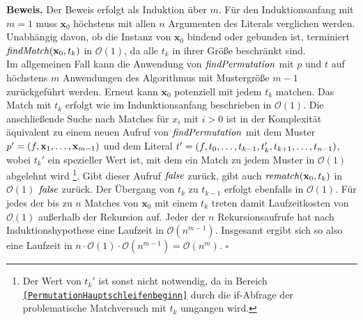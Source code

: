 \textbf{Beweis.}
Der Beweis erfolgt als Induktion über $m$.
Für den Induktionsanfang mit $m = 1$ muss $\mathbf x_0$ höchstens mit allen $n$ Argumenten des Literals verglichen werden. Unabhängig davon, ob die Instanz von $\mathbf x_0$ bindend oder gebunden ist, terminiert $\mathit{findMatch}(\mathbf x_0, t_k)$ in $\mathcal O(1)$, da alle $t_k$ in ihrer Größe beschränkt sind. \\
Im allgemeinen Fall kann die Anwendung von $\mathit{findPermutation}$ mit $p$ und $t$ auf höchstens $m$ Anwendungen des Algorithmus mit Mustergröße $m-1$ zurückgeführt werden. Erneut kann $\mathbf x_0$ potenziell mit jedem $t_k$ matchen. Das Match mit $t_k$ erfolgt wie im Indunktionsanfang beschrieben in $\mathcal O (1)$. Die anschließende Suche nach Matches für $x_i$ mit $i > 0$ ist in der Komplexität äquivalent zu einem neuen Aufruf von $\mathit{findPermutation}$ mit dem Muster $p' = (f, {\mathbf x}_{1}, \dots, {\mathbf x}_{m-1})$ und dem Literal $t' = (f, {t}_{0}, \dots, {t}_{k-1}, t_k', {t}_{k+1}, \dots, {t}_{n-1})$, wobei $t_k'$ ein spezieller Wert ist, mit dem ein Match zu jedem Muster in $\mathcal O (1)$ abgelehnt wird \footnote{Der Wert von $t_k'$ ist sonst nicht notwendig, da in Bereich \texttt{\ref{PermutationHauptschleifenbeginn}} durch die if-Abfrage der problematische Matchversuch mit $t_k$ umgangen wird.}. Gibt dieser Aufruf $\mathit{false}$ zurück, gibt auch $\mathit{rematch}(\mathbf x_0, t_k)$ in $\mathcal O (1)$ $\mathit{false}$ zurück. Der Übergang von $t_k$ zu $t_{k-1}$ erfolgt ebenfalls in $\mathcal O (1)$. Für jedes der bis zu $n$ Matches von $\mathbf x_0$ mit einem $t_k$ treten damit Laufzeitkosten von $\mathcal O (1)$ außerhalb der Rekursion auf. Jeder der $n$ Rekursionsaufrufe hat nach Induktionshypothese eine Laufzeit in $\mathcal O (n^{m-1})$. Insgesamt ergibt sich so also eine Laufzeit in $n \cdot \mathcal O (1) \cdot \mathcal O (n^{m-1}) = \mathcal O (n^m)$.
\hfill $\square$\\


